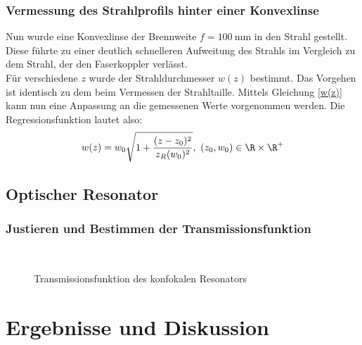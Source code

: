 \documentclass[11pt,a4paper,oneside]{scrartcl}
\begin{document}
\subsubsection{Vermessung des Strahlprofils hinter einer Konvexlinse}
Nun wurde eine Konvexlinse der Brennweite $f=100\ \mathrm{mm}$ in den Strahl gestellt. Diese führte zu einer deutlich schnelleren Aufweitung des Strahls im Vergleich zu dem Strahl, der den Faserkoppler verlässt. \\
Für verschiedene $z$ wurde der Strahldurchmesser $w(z)$ bestimmt. Das Vorgehen ist identisch zu dem beim Vermessen der Strahltaille. Mittels Gleichung \ref{w(z)} kann nun eine Anpassung an die gemessenen Werte vorgenommen werden. Die Regressionsfunktion lautet also:
\begin{equation}\label{w(z)}
w(z)=w_0\sqrt{1+\frac{(z-z_0)^2}{z_R(w_0)^2}},\ (z_0,w_0)\in \R\times\R^+
\end{equation}
\subsection{Optischer Resonator}

\subsubsection{Justieren und Bestimmen der Transmissionsfunktion}
\begin{figure}[H]

    \centering
  \\
   \caption{Transmissionsfunktion des konfokalen Resonators}
    \label{FotostreckeTransmissionsfunktion}
\end{figure}

\section{Ergebnisse und Diskussion}
\end{document}

